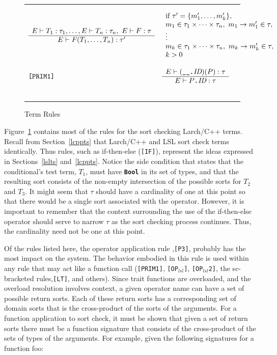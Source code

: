 \documentclass[12pt]{article} %
\newcommand{\reserved}[1]{\textbf{\texttt{#1}}} %
\newcommand{\RULELAB}[1]{\texttt{#1}}
\newcommand{\UNSPACEFORBOX}{\vspace{-2ex}}
\newcommand{\HLINE}{\UNSPACEFORBOX%
\begin{flushleft}\rule{\textwidth}{0.01in}\end{flushleft}%
\UNSPACEFORBOX}
\newenvironment{BFIGURE}{

\begin{figure}
\small
\HLINE
}{
\HLINE
\normalsize
\end{figure}
}
\begin{document}
\begin{BFIGURE}
\begin{displaymath}
\begin{array}{lll}
\begin{array}{c}
E \vdash T_1:\tau_1,\dots,E \vdash T_n:\tau_n,~ E \vdash F:\tau \\
\hline
E \vdash \mbox{\textit{F}}(T_1,\dots,T_n):\tau'
\end{array}
&
\begin{array}{l}
\mbox{if } \tau' = \{m_1',\dots,m_k'\},\\
m_1 \in \tau_1 \times \dots \times \tau_n,~m_1 \rightarrow m_1' \in
\tau,\\
\vdots\\
m_k \in \tau_1 \times \dots \times \tau_n,~m_k \rightarrow m_k' \in
\tau,\\
k > 0
\end{array}
\\
~\\
\RULELAB{[PRIM1]} &
\begin{array}{c}
E \vdash (\mbox{\reserved{\_\_.}}\mbox{\it ID})(P):\tau \\
\hline
E \vdash P\mbox{\reserved{.}}\mbox{\it ID}:\tau
\end{array}
\\
~\\
\end{array}
\end{displaymath}
\caption{Term Rules}
\label{fig-term}
\end{BFIGURE}

Figure~\ref{fig-term} contains most of the rules for the sort checking
Larch/C++ terms. Recall from Section~\ref{lcppts} that
Larch/C++ and LSL sort check terms identically. Thus rules, such as
if-then-else (\RULELAB{[IF]}), represent the ideas expressed in
Sections~\ref{lslts} and~\ref{lcppts}. Notice the side condition that
states that the conditional's test term, $T_1$, must have \reserved{Bool} in its
set of types, and that the resulting sort consists of the non-empty
intersection of the possible sorts for $T_2$ and $T_3$. It might seem
that $\tau$ should have a cardinality of one at this point so that
there would be a single sort associated with the operator. However, it
is important to remember that the context surrounding the use of the
if-then-else operator should serve to narrow $\tau$ as the sort
checking process continues. Thus, the cardinality need not be one at
this point.

Of the rules listed here, the operator application rule
,\RULELAB{[P3]}, probably has the most impact on the system. The
behavior embodied in this rule is used within any rule that may act
like a function call (\RULELAB{[PRIM1]}, \RULELAB{[OP$_{lsl}$]},
\RULELAB{[OP$_{lsl}$2]}, the sc-bracketed rules,\RULELAB{[LT]}, and
others). Since trait functions are overloaded, and the overload
resolution involves context, a given operator name can have a set of
possible return sorts. Each of these return sorts has a corresponding set
of domain sorts that is the cross-product of the sorts of the
arguments. For a function application to sort check, it must be shown
that given a set of return sorts there must be a function signature
that consists of the cross-product of the sets of types of the
arguments. For example, given the following signatures for a function
foo:
\end{document}
